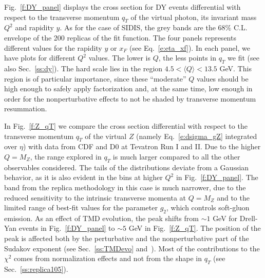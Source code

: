 \documentclass[aps,preprintnumbers,showpacs,nofootinbib,superscriptaddress,floatfix]{revtex4}
\begin{document}

Fig.~\ref{f:DY_panel} displays the cross section for DY events differential with respect to the transverse momentum $q_T$ of the virtual photon, its invariant mass $Q^2$ and rapidity $y$.  
As for the case of SIDIS, the grey bands are the $68\%$ C.L. envelope of the
200 replicas of the fit function. The four panels represents different values
for the rapidity $y$ or $x_F$ (see Eq.~\eqref{e:eta_xf}). In each panel, we have plots for different $Q^2$ values.
The lower is $Q$, the less points in $q_T$ we fit (see also Sec.~\ref{ss:dy}). 
The hard scale lies in the region $4.5 < \langle Q \rangle < 13.5$ GeV. This
region is of particular importance, since these ``moderate'' $Q$ values should
be high enough to safely apply factorization and, at the same time, low enough
in order for the nonperturbative effects to not be shaded by transverse
momentum resummation. 

In Fig.~\ref{f:Z_qT} we compare the cross section differential with respect to the transverse momentum $q_T$ of the virtual $Z$ (namely Eq.~\eqref{e:dsigma_gZ} integrated over $\eta$) with data from CDF and D0 at Tevatron Run I and II. 
Due to the higher $Q = M_Z$, the range explored in $q_T$ is much larger compared to all the other observables considered. The tails of the distributions deviate from a Gaussian behavior, as it is also evident in the bins at higher $Q^2$ in Fig.~\ref{f:DY_panel}. The band from the replica methodology in this case is much narrower, due to the reduced sensitivity to the intrinsic transverse momenta at $Q=M_Z$ and to the limited range of best-fit values for the parameter $g_2$, which controls soft-gluon emission. 
As an effect of TMD evolution, the peak shifts from $\sim 1$ GeV for Drell-Yan events in Fig.~\ref{f:DY_panel} to $\sim 5$ GeV in Fig.~\ref{f:Z_qT}. The position of the peak is affected both by the perturbative and the nonperturbative part of the Sudakov exponent (see Sec.~\ref{ss:TMDevo} and~\cite{Signori:2016lvd}).
Most of the contributions to the $\chi^2$ comes from normalization effects and
not from the shape in $q_T$ (see Sec.~\ref{ss:replica105}). 
\end{document}

